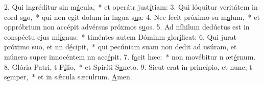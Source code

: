 2. Qui ingréditur sin m\uline{á}cula,~* et operátr just\uline{í}tiam:
3. Qui lóquitur veritátem in cord s\uline{u}o,~* qui non egit dolum in lngua s\uline{u}a:
4. Nec fecit próximo su m\uline{a}lum,~* et oppróbrium non accépit advérsus próxmos s\uline{u}os.
5. Ad níhilum dedúctus est in conspéctu ejus ml\uline{í}gnus:~* timéntes autem Dóminm glor\uline{í}ficat:
6. Qui jurat próximo suo, et nn d\uline{é}cipit,~* qui pecúniam suam non dedit ad usúram, et múnera super innocéntem nn acc\uline{é}pit.
7.  f\uline{a}cit hæc:~* non movébitur n æt\uline{é}rnum.
8. Glória Patri, t F\uline{í}lio,~* et Spiríti S\uline{a}ncto.
9. Sicut erat in princípio, et nunc, t s\uline{e}mper,~* et in sǽcula sæculrum. \uline{A}men.
